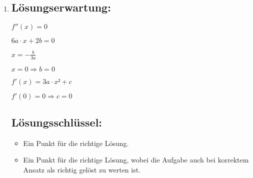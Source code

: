 \begin{langesbeispiel}
{\begin{enumerate}
	\subsection{Lösungsschlüssel:}
	
\begin{itemize}
	\item Ein Punkt für die Angabe der beiden korrekten Werte.
	\item Ein Punkt für die richtige Lösung und eine korrekte Begründung.  
\end{itemize}

	\item \subsection{Lösungserwartung:}
			
	$f''(x)=0$
	
	$6a\cdot x+2b=0$
	
	$x=-\frac{b}{3a}$
	
	$x=0 \Rightarrow b=0$\leer
	
	$f'(x)=3a\cdot x²+c$
	
	$f'(0)=0 \Rightarrow c=0$
	
	\subsection{Lösungsschlüssel:}
	
\begin{itemize}
	\item Ein Punkt für die richtige Lösung.
	\item Ein Punkt für die richtige Lösung, wobei die Aufgabe auch bei korrektem Ansatz als richtig gelöst zu werten ist.  
\end{itemize}

\end{enumerate}}
		\end{langesbeispiel}